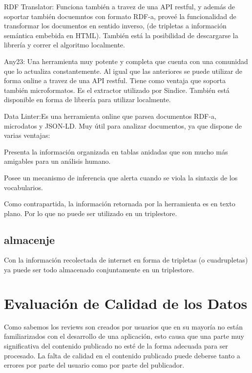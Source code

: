 RDF Translator: Funciona también a travez de una API restful, y además de soportar también docuemntos con formato RDF-a, proveé la funcionalidad de transformar los documentos en sentido inverso, 
(de tripletas a información semántica embebida en HTML). 
También está la posibilidad de descargarse la librería y correr el algoritmo localmente.

Any23: Una herramienta muy potente y completa que cuenta con una comunidad que lo actualiza constantemente. Al igual que las anteriores se puede utilizar de forma online a travez 
de una API restful. Tiene como ventaja que soporta también microformatos. Es el extractor utilizado por Sindice. 
También está disponible en forma de librería para utilizar localmente.

Data Linter:Es una herramienta online que parsea documentos RDF-a, microdatos y JSON-LD.  
Muy útil para analizar documentos, ya que dispone de varias ventajas: 

Presenta la información organizada en tablas anidadas que son mucho más amigables para un análisis humano. 

Posee un mecanismo de inferencia que alerta cuando se viola la sintaxis de los vocabularios.

Como contrapartida, la información retornada por la herramienta es en texto plano. Por lo que no puede ser utilizado en un triplestore.


\subsection{almacenje}

Con la información recolectada de internet en forma de tripletas (o cuadrupletas) ya puede ser todo almacenado conjuntamente en un triplestore. 


%

 

\section{Evaluación de Calidad de los Datos} 
Como sabemos los reviews son creados por usuarios que en su mayoría no están familiarizados con el desarrollo de una 
aplicación, esto causa que una parte muy significativa del contenido publicado no esté de la forma adecuada para ser procesado. 
La falta de calidad en el contenido publicado puede deberse tanto a errores por parte del usuario como por parte del publicador.



